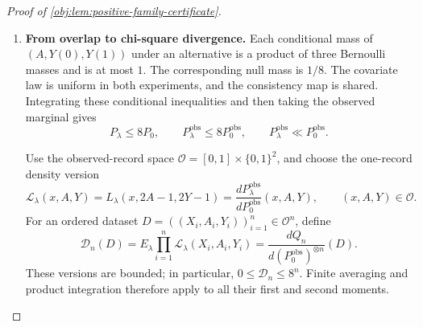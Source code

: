 \documentclass[11pt]{article}
\begin{document}
\begin{proof}[Proof of \cref{obj:lem:positive-family-certificate}]
\begin{enumerate}
Let \(\lambda'\) be an independent uniform encoding, and define
\(E_{\lambda,\lambda'}=E_{\lambda'}E_\lambda\).
Averaging the fixed-\(\lambda'\) inequality gives
\[
\begin{aligned}
E_{\lambda,\lambda'}\exp(nH_{\lambda,\lambda'})
&=\frac1{2^{2|\mathcal J|}}
 \sum_{\lambda,\lambda'\in\{0,1\}^{\mathcal J}}
                      \exp(nH_{\lambda,\lambda'})\\
&\le\exp\!\left\{160n^2t^2h_{\mathrm L}\delta_{\mathrm L}\right\}.
\end{aligned}
\]

\item \textbf{From overlap to chi-square divergence.}
Each conditional mass of \((A,Y(0),Y(1))\) under an alternative is
a product of three Bernoulli masses and is at most \(1\).
The corresponding null mass is \(1/8\).
The covariate law is uniform in both experiments, and the consistency
map is shared. Integrating these conditional inequalities and then
taking the observed marginal gives
\[
P_\lambda\le8P_0,
\qquad
P_\lambda^{\mathrm{obs}}\le8P_0^{\mathrm{obs}},
\qquad
P_\lambda^{\mathrm{obs}}\ll P_0^{\mathrm{obs}}.
\]

Use the observed-record space
\(\mathcal O=[0,1]\times\{0,1\}^2\), and choose the one-record density
version
\[
\mathscr L_\lambda(x,A,Y)
=L_\lambda(x,2A-1,2Y-1)
=\frac{dP_\lambda^{\mathrm{obs}}}{dP_0^{\mathrm{obs}}}(x,A,Y),
\qquad (x,A,Y)\in\mathcal O.
\]
For an ordered dataset
\(D=((X_i,A_i,Y_i))_{i=1}^n\in\mathcal O^n\), define
\[
\mathscr D_n(D)
=E_\lambda\prod_{i=1}^n\mathscr L_\lambda(X_i,A_i,Y_i)
=\frac{dQ_n}{d(P_0^{\mathrm{obs}})^{\otimes n}}(D).
\]
These versions are bounded; in particular,
\(0\le\mathscr D_n\le8^n\).
Finite averaging and product integration therefore apply to all their
first and second moments.


\end{enumerate}
\end{proof}
\end{document}

